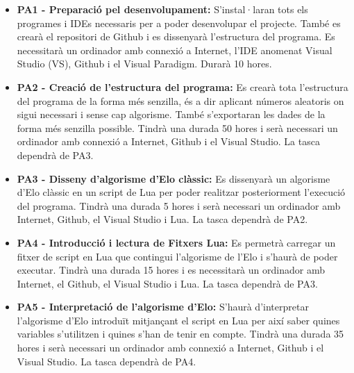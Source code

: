 \documentclass[a4paper]{article}
\newcounter{subsubsubsection}[subsubsection]
\begin{document}
\begin{itemize}
    \item \textbf{PA1 - Preparació pel desenvolupament:} S'instal·laran tots els programes i IDEs necessaris per a poder desenvolupar el projecte. També es crearà el repositori de Github i es dissenyarà l'estructura del programa. Es necessitarà un ordinador amb connexió a Internet, l'IDE anomenat Visual Studio (VS), Github i el Visual Paradigm. Durarà 10 hores.
    \item \textbf{PA2 - Creació de l'estructura del programa:} Es crearà tota l'estructura del programa de la forma més senzilla, és a dir aplicant números aleatoris on sigui necessari i sense cap algorisme. També s'exportaran les dades de la forma més senzilla possible. Tindrà una durada 50 hores i serà necessari un ordinador amb connexió a Internet, Github i el Visual Studio. La tasca dependrà de PA3.
    \item \textbf{PA3 - Disseny d'algorisme d'Elo clàssic:} Es dissenyarà un algorisme d'Elo clàssic en un script de Lua per poder realitzar posteriorment l'execució del programa. Tindrà una durada 5 hores i serà necessari un ordinador amb Internet, Github, el Visual Studio i Lua. La tasca dependrà de PA2.
    \item \textbf{PA4 - Introducció i lectura de Fitxers Lua:} Es permetrà carregar un fitxer de script en Lua que contingui l'algorisme de l'Elo i s'haurà de poder executar. Tindrà una durada 15 hores i es necessitarà un ordinador amb Internet, el Github, el Visual Studio i Lua. La tasca dependrà de PA3.
    \item \textbf{PA5 - Interpretació de l'algorisme d'Elo:} S'haurà d'interpretar l'algorisme d'Elo introduït mitjançant el script en Lua per així saber quines variables s'utilitzen i quines s'han de tenir en compte. Tindrà una durada 35 hores i serà necessari un ordinador amb connexió a Internet, Github i el Visual Studio. La tasca dependrà de PA4.
\end{itemize}
\end{document}
